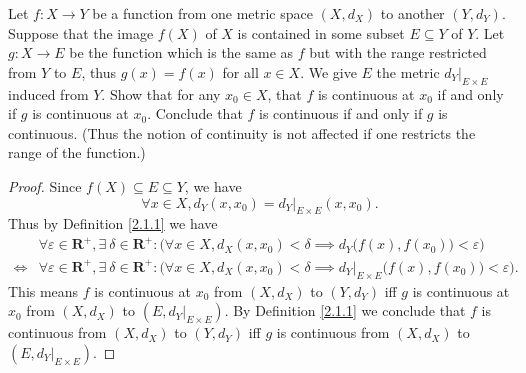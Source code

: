 \begin{exercise}\label{ex 2.1.7}
    Let \(f : X \to Y\) be a function from one metric space \((X, d_X)\) to another \((Y, d_Y)\).
    Suppose that the image \(f(X)\) of \(X\) is contained in some subset \(E \subseteq Y\) of \(Y\).
    Let \(g : X \to E\) be the function which is the same as \(f\) but with the range restricted from \(Y\) to \(E\), thus \(g(x) = f(x)\) for all \(x \in X\).
    We give \(E\) the metric \(d_Y|_{E \times E}\) induced from \(Y\).
    Show that for any \(x_0 \in X\), that \(f\) is continuous at \(x_0\) if and only if \(g\) is continuous at \(x_0\).
    Conclude that \(f\) is continuous if and only if \(g\) is continuous.
    (Thus the notion of continuity is not affected if one restricts the range of the function.)
\end{exercise}

\begin{proof}
    Since \(f(X) \subseteq E \subseteq Y\), we have
    \[
        \forall x \in X, d_Y(x, x_0) = d_Y|_{E \times E}(x, x_0).
    \]
    Thus by Definition \ref{2.1.1} we have
    \begin{align*}
             & \forall \varepsilon \in \mathbf{R}^+, \exists\ \delta \in \mathbf{R}^+ : \Big(\forall x \in X, d_X(x, x_0) < \delta \implies d_Y\big(f(x), f(x_0)\big) < \varepsilon\Big)                \\
        \iff & \forall \varepsilon \in \mathbf{R}^+, \exists\ \delta \in \mathbf{R}^+ : \Big(\forall x \in X, d_X(x, x_0) < \delta \implies d_Y|_{E \times E}\big(f(x), f(x_0)\big) < \varepsilon\Big).
    \end{align*}
    This means \(f\) is continuous at \(x_0\) from \((X, d_X)\) to \((Y, d_Y)\) iff \(g\) is continuous at \(x_0\) from \((X, d_X)\) to \((E, d_Y|_{E \times E})\).
    By Definition \ref{2.1.1} we conclude that \(f\) is continuous from \((X, d_X)\) to \((Y, d_Y)\) iff \(g\) is continuous from \((X, d_X)\) to \((E, d_Y|_{E \times E})\).
\end{proof}